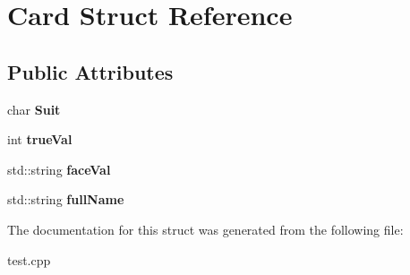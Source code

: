 \hypertarget{structCard}{\section{Card Struct Reference}
\label{structCard}
}
\subsection*{Public Attributes}
\begin{DoxyCompactItemize}
\item 
\hypertarget{structCard_abb32fd31660ca59519898f83d6b3f1b9}{char {\bfseries Suit}}\label{structCard_abb32fd31660ca59519898f83d6b3f1b9}

\item 
\hypertarget{structCard_aca075e8fc25be8356e3516fc7d4a6161}{int {\bfseries true\-Val}}\label{structCard_aca075e8fc25be8356e3516fc7d4a6161}

\item 
\hypertarget{structCard_a35b97d41800cbe3b2c55e2aab9cca555}{std\-::string {\bfseries face\-Val}}\label{structCard_a35b97d41800cbe3b2c55e2aab9cca555}

\item 
\hypertarget{structCard_a14bca9855ebbff6ecf9ffb8a37801a8f}{std\-::string {\bfseries full\-Name}}\label{structCard_a14bca9855ebbff6ecf9ffb8a37801a8f}

\end{DoxyCompactItemize}


The documentation for this struct was generated from the following file\-:\begin{DoxyCompactItemize}
\item 
test.\-cpp\end{DoxyCompactItemize}
